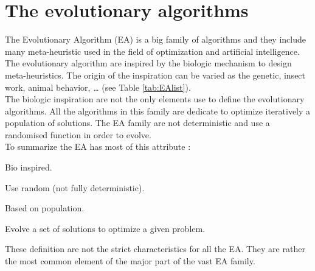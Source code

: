 \section{The evolutionary algorithms }
The Evolutionary Algorithm (EA) is a big family of algorithms and they include many meta-heuristic used in the field of optimization and artificial intelligence.\\
 The evolutionary algorithm are inspired by the biologic mechanism to design meta-heuristics. The origin of the inspiration can be varied as  the genetic, insect work, animal behavior, … (see Table  \ref{tab:EAlist}). \\
 The biologic inspiration are not the only elements use to define the evolutionary algorithms. All the algorithms in this family are dedicate to optimize iteratively a population of solutions. 
 The EA family are not deterministic and use a randomised function in order to evolve. \\
 To summarize the EA has most of this attribute : 
\begin{description}
\item Bio inspired. 
\item Use random (not fully deterministic).
\item Based on population. 
\item Evolve a set of solutions to optimize a given problem.
\end{description}
These definition are not the strict characteristics for all the EA. They are rather the most common element of the major part of the vast EA family. %
 
